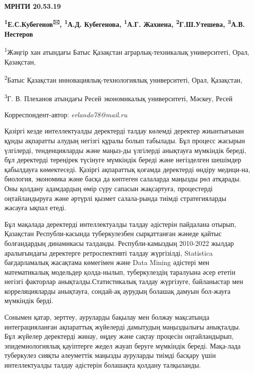 
\newpage
{\bfseries МРНТИ 20.53.19}

\begin{center}

{\bfseries \textsuperscript{1}Е.С.Кубегенов\textsuperscript{🖂},
\textsuperscript{1}А.Д. Кубегенова, \textsuperscript{1}А.Г. Жахиена,
\textsuperscript{2}Г.Ш.Утешева, \textsuperscript{3}А.В. Нестеров}

\textsuperscript{1}Жәңгір хан атындағы Батыс Қазақстан
аграрлық-техникалық университеті, Орал, Қазақстан,

\textsuperscript{2}Батыс Қазақстан инновациялық-технологиялық
университеті, Орал, Қазақстан,

\textsuperscript{3}Г. В. Плеханов атындағы Ресей экономикалық
университеті, Мәскеу, Ресей
\end{center}
Корреспондент-автор: \emph{erlando78@mail.ru}


Қазіргі кезде интеллектуалды деректерді талдау көлемді деректер
жиынтығынан құнды ақпаратты алудың негізгі құралы болып табылады. Бұл
процесс жасырын үлгілерді, тенденцияларды және маңыз-ды үлгілерді
анықтауға мүмкіндік береді, бұл деректерді тереңірек түсінуге мүмкіндік
береді және негізделген шешімдер қабылдауға көмектеседі. Қазіргі
ақпараттық қоғамда деректерді өндіру медици-на, биология, экономика және
басқа да көптеген салаларда маңызды рөл атқарады. Оны қолдану адамдардың
өмір сүру сапасын жақсартуға, процестерді оңтайландыруға және әртүрлі
қызмет салала-рында тиімді стратегияларды жасауға ықпал етеді.

Бұл мақалада деректерді интеллектуалды талдау әдістерін пайдалана
отырып, Қазақстан Республи-касында туберкулезбен сырқаттанған жәнеде
қайтыс болғандардың динамикасы талданды. Республи-камыздың 2010-2022
жылдар аралығындағы деректерге ретроспективті талдау жүргізілді,
Statistica бағдарламалық жасақтама көмегімен және Data Mining әдістері
мен математикалық модельдер қолда-нылып, туберкулездің таралуына әсер
ететін негізгі факторлар анықталды.Статистикалық талдау жүргізуге,
байланыстар мен корреляцияларды анықтауға, сондай-ақ аурудың болашақ
дамуын бол-жауға мүмкіндік берді.

Сонымен қатар, зерттеу, ауруларды бақылау мен болжау мақсатында
интеграцияланған ақпараттық жүйелерді дамытудың маңыздылығы анықталды.
Бұл жүйелер деректерді жинау, өңдеу және сақтау процесін оңтайландырып,
эпидемиологиялық қауіптерге жедел жауап беруге мүмкіндік береді.
Мақа-лада туберкулез сияқты әлеуметтік маңызды ауруларды тиімді басқару
үшін интеллектуалды талдау әдістерін болашақта қолдану талқыланды.

